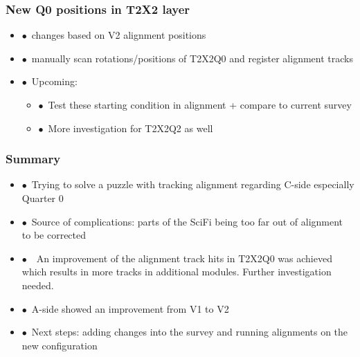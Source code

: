 \documentclass[aspectratio=1610, 12pt]{beamer}
\begin{document}
\begin{frame}\frametitle{New Q0 positions in T2X2 layer}
  \begin{itemize}
    \item $\bullet$\, changes based on V2 alignment positions
    \item $\bullet$\, manually scan rotations/positions of T2X2Q0 and register alignment tracks
    \item $\bullet$\, Upcoming:
    \begin{itemize}
      \item $\bullet$\, Test these starting condition in alignment + compare to current survey
      \item $\bullet$\, More investigation for T2X2Q2 as well
    \end{itemize}
  \end{itemize}
  \begin{figure}
  \end{figure}
\end{frame}

\begin{frame}\frametitle{Summary}
  \begin{itemize}
    \item $\bullet$\, Trying to solve a puzzle with tracking alignment regarding C-side especially Quarter 0
    \item $\bullet$\, Source of complications: parts of the SciFi being too far out of alignment to be corrected
    \item $\bullet$\, \to\, An improvement of the alignment track hits in T2X2Q0 was achieved which results in more tracks in additional modules. Further investigation needed.
    \item $\bullet$\, A-side showed an improvement from V1 to V2
    \item $\bullet$\, Next steps: adding changes into the survey and running alignments on the new configuration
  \end{itemize}
\end{frame}
\end{document}
